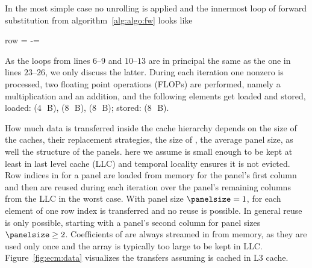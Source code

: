 In the most simple case no unrolling is applied and the innermost loop of
forward substitution from algorithm~\ref{alg:algo:fw} looks like
%
\begin{algorithmic}[1]
  \setcounter{ALG@line}{22}
      \State row = \nindx[i++]
      \State \nr[row] -= \nr[j] \nlnz[k]
  \EndFor
\end{algorithmic}
As the loops from lines $6$--$9$ and $10$--$13$ are in principal the same as the
one in lines $23$--$26$, we only discuss the latter.
%
During each iteration one nonzero is processed, two floating point operations (FLOPs) are performed,
namely a multiplication and an addition, and the following elements get
loaded and stored, loaded: \vindx{} ($4$~\,B), \vr{} ($8$~\,B), \vlnz{}
($8$~\,B); stored: \vr{} ($8$~\,B).

How much data is transferred inside the cache hierarchy depends on the size of
the caches, their replacement strategies, the size of \vr{}, the average panel
size, as well the structure of the panels.
here we assume \vr{} is small enough to be kept at least in last level cache
(LLC) and temporal locality ensures it is not evicted.
%
Row indices in \vindx{} for a panel are loaded from memory for the panel's first
column and then are reused during each iteration over the panel's remaining
columns from the LLC in the worst case.
With panel size $\panelsize=1$, for each element of \vlnz{} one row index is
transferred and no reuse is possible.
In general reuse is only possible, starting with a panel's second column for
panel sizes $\panelsize \ge 2$.
%
Coefficients of \vlnz{} are always streamed in from memory, as they are
used only once and the \vlnz{} array is typically too large to be kept in LLC.
Figure~\ref{fig:ecm:data} visualizes the transfers assuming 
\vr{} is cached in L3 cache.

